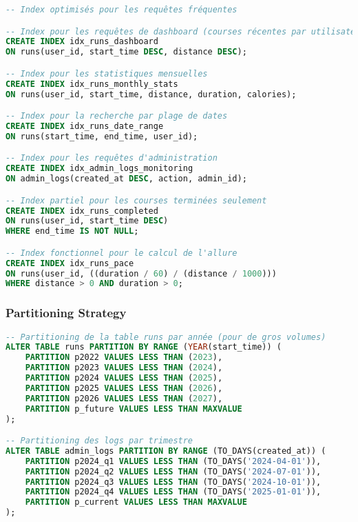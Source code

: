 \begin{lstlisting}[language=sql]
-- Index optimisés pour les requêtes fréquentes

-- Index pour les requêtes de dashboard (courses récentes par utilisateur)
CREATE INDEX idx_runs_dashboard 
ON runs(user_id, start_time DESC, distance DESC);

-- Index pour les statistiques mensuelles
CREATE INDEX idx_runs_monthly_stats 
ON runs(user_id, start_time, distance, duration, calories);

-- Index pour la recherche par plage de dates
CREATE INDEX idx_runs_date_range 
ON runs(start_time, end_time, user_id);

-- Index pour les requêtes d'administration
CREATE INDEX idx_admin_logs_monitoring 
ON admin_logs(created_at DESC, action, admin_id);

-- Index partiel pour les courses terminées seulement
CREATE INDEX idx_runs_completed 
ON runs(user_id, start_time DESC) 
WHERE end_time IS NOT NULL;

-- Index fonctionnel pour le calcul de l'allure
CREATE INDEX idx_runs_pace 
ON runs(user_id, ((duration / 60) / (distance / 1000))) 
WHERE distance > 0 AND duration > 0;
\end{lstlisting}

\subsubsection{Partitioning Strategy}

\begin{lstlisting}[language=sql]
-- Partitioning de la table runs par année (pour de gros volumes)
ALTER TABLE runs PARTITION BY RANGE (YEAR(start_time)) (
    PARTITION p2022 VALUES LESS THAN (2023),
    PARTITION p2023 VALUES LESS THAN (2024),
    PARTITION p2024 VALUES LESS THAN (2025),
    PARTITION p2025 VALUES LESS THAN (2026),
    PARTITION p2026 VALUES LESS THAN (2027),
    PARTITION p_future VALUES LESS THAN MAXVALUE
);

-- Partitioning des logs par trimestre
ALTER TABLE admin_logs PARTITION BY RANGE (TO_DAYS(created_at)) (
    PARTITION p2024_q1 VALUES LESS THAN (TO_DAYS('2024-04-01')),
    PARTITION p2024_q2 VALUES LESS THAN (TO_DAYS('2024-07-01')),
    PARTITION p2024_q3 VALUES LESS THAN (TO_DAYS('2024-10-01')),
    PARTITION p2024_q4 VALUES LESS THAN (TO_DAYS('2025-01-01')),
    PARTITION p_current VALUES LESS THAN MAXVALUE
);
\end{lstlisting}

